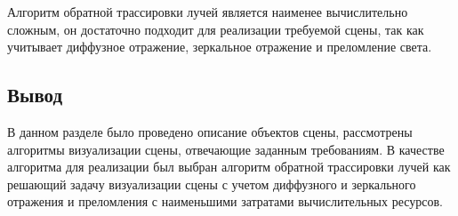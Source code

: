 Алгоритм обратной трассировки лучей является наименее вычислительно сложным, он достаточно подходит для реализации требуемой сцены, так как учитывает диффузное отражение, зеркальное отражение и преломление света.

\subsection*{Вывод}
В данном разделе было проведено описание объектов сцены, рассмотрены алгоритмы визуализации сцены, отвечающие заданным требованиям. В качестве алгоритма для реализации был выбран алгоритм обратной трассировки лучей как решающий задачу визуализации сцены с учетом диффузного и зеркального отражения и преломления с наименьшими затратами вычислительных ресурсов.




\clearpage
